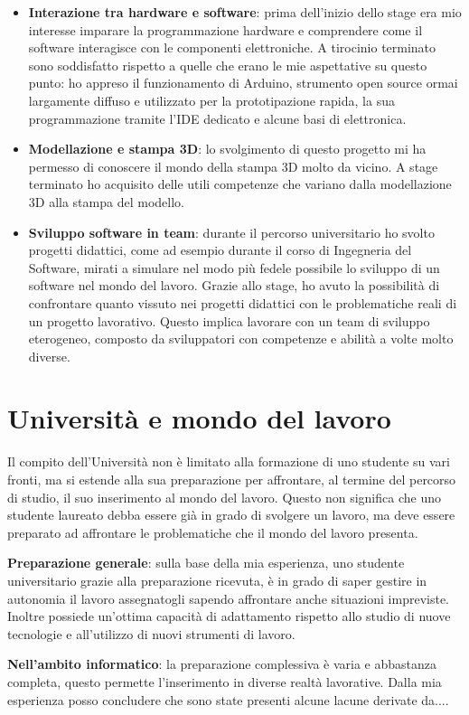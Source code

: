 \begin{itemize}
\item \textbf{Interazione tra hardware e software}: prima dell'inizio dello stage era mio interesse imparare la programmazione hardware e comprendere come il software interagisce con le componenti elettroniche. A tirocinio terminato sono soddisfatto rispetto a quelle che erano le mie aspettative su questo punto: ho appreso il funzionamento di Arduino, strumento open source ormai largamente diffuso e utilizzato per la prototipazione rapida, la sua programmazione tramite l'IDE dedicato e alcune basi di elettronica.
\item \textbf{Modellazione e stampa 3D}: lo svolgimento di questo progetto mi ha permesso di conoscere il mondo della stampa 3D molto da vicino. A stage terminato ho acquisito delle utili competenze che variano dalla modellazione 3D alla stampa del modello.
\item \textbf{Sviluppo software in team}: durante il percorso universitario ho svolto progetti didattici, come ad esempio durante il corso di Ingegneria del Software, mirati a simulare nel modo più fedele possibile lo sviluppo di un software nel mondo del lavoro. Grazie allo stage, ho avuto la possibilità di confrontare quanto vissuto nei progetti didattici con le problematiche reali di un progetto lavorativo. Questo implica lavorare con un team di sviluppo eterogeneo, composto da sviluppatori con competenze e abilità a volte molto diverse.
\end{itemize}

\section{Università e mondo del lavoro}
Il compito dell'Università non è limitato alla formazione di uno studente su vari fronti, ma si estende alla sua preparazione per affrontare, al termine del percorso di studio, il suo inserimento al mondo del lavoro. Questo non significa che uno studente laureato debba essere già in grado di svolgere un lavoro, ma deve essere preparato ad affrontare le problematiche che il mondo del lavoro presenta. 

\medskip

\textbf{Preparazione generale}: sulla base della mia esperienza, uno studente universitario grazie alla preparazione ricevuta, è in grado di saper gestire in autonomia il lavoro assegnatogli sapendo affrontare anche situazioni impreviste. Inoltre possiede un'ottima capacità di adattamento rispetto allo studio di nuove tecnologie e all'utilizzo di nuovi strumenti di lavoro.

\medskip

\textbf{Nell'ambito informatico}: la preparazione complessiva è varia e abbastanza completa, questo permette l'inserimento in diverse realtà lavorative. Dalla mia esperienza posso concludere che sono state presenti alcune lacune derivate da....
